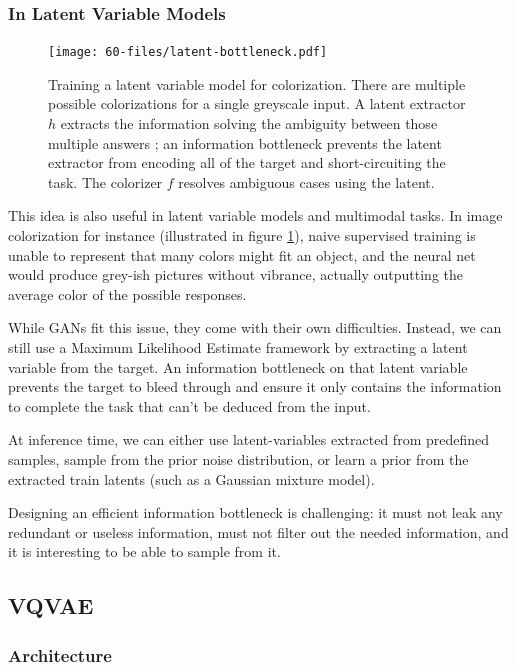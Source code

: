 \subsubsection{In Latent Variable Models}
\label{sec:lvm}

\begin{figure}[ht]
    \centering
    \texttt{[image: 60-files/latent-bottleneck.pdf]}
    \caption{Training a latent variable model for colorization. There are multiple possible colorizations for a single greyscale input. A latent extractor $h$ extracts the information solving the ambiguity between those multiple answers ; an information bottleneck prevents the latent extractor from encoding all of the target and short-circuiting the task. The colorizer $f$ resolves ambiguous cases using the latent.}
    \label{fig:latent-bottleneck}
\end{figure}

This idea is also useful in latent variable models and multimodal tasks. In image colorization for instance (illustrated in figure \ref{fig:latent-bottleneck}), naive supervised training is unable to represent that many colors might fit an object, and the neural net would produce grey-ish pictures without vibrance, actually outputting the average color of the possible responses.

While \acp{GAN} fit this issue, they come with their own difficulties. Instead, we can still use a Maximum Likelihood Estimate framework by extracting a latent variable from the target. An information bottleneck on that latent variable prevents the target to bleed through and ensure it only contains the information to complete the task that can't be deduced from the input.

At inference time, we can either use latent-variables extracted from predefined samples, sample from the prior noise distribution, or learn a prior from the extracted train latents (such as a Gaussian mixture model).

Designing an efficient information bottleneck is challenging: it must not leak any redundant or useless information, must not filter out the needed information, and it is interesting to be able to sample from it.

\subsection{\ac{VQVAE}}
\label{section:vqvae}

\subsubsection{Architecture}

